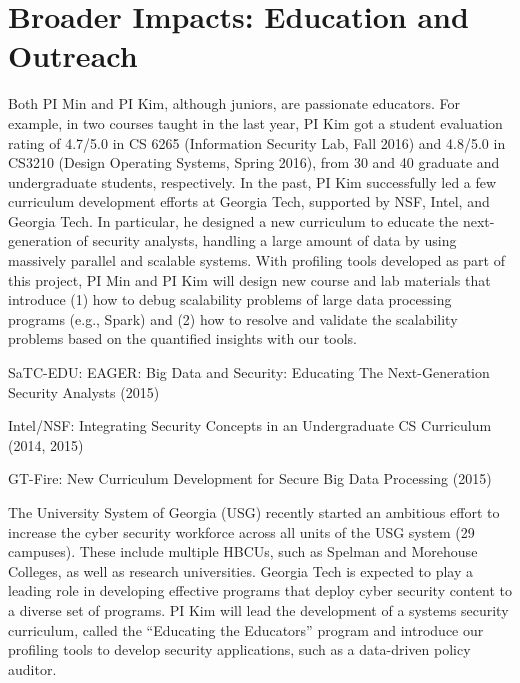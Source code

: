 \section{Broader Impacts: Education and Outreach}
\label{sec:impact}

Both PI Min and PI Kim, although juniors, are passionate
educators. For example, in two courses taught in the last year, 
PI Kim got a student evaluation rating of 4.7/5.0 in CS 6265 (Information Security Lab, Fall 2016)
and 4.8/5.0 in CS3210 (Design Operating Systems, Spring 2016),
from 30 and 40 graduate and undergraduate students, respectively.
%
In the past, PI Kim successfully led a few curriculum development efforts
at Georgia Tech, supported by NSF, Intel, and Georgia Tech. In particular,
he designed a new curriculum to educate
the next-generation of security analysts,
handling a large amount of data
by using massively parallel and scalable systems.
%
With profiling tools developed as part of this project, 
PI Min and PI Kim will design new course and lab materials
that introduce (1) how to debug scalability problems of
large data processing programs (e.g., Spark)
and (2) how to resolve and validate the scalability problems
based on the quantified insights with our tools.

\squishlist
\item SaTC-EDU: EAGER: Big Data and Security: Educating The Next-Generation Security Analysts (2015)
\item Intel/NSF: Integrating Security Concepts in an Undergraduate CS Curriculum (2014, 2015)
\item GT-Fire: New Curriculum Development for Secure Big Data Processing (2015)
\squishend

The University System of Georgia (USG) recently started an ambitious
effort to increase the cyber security workforce
across all units of the USG system (29 campuses). 
%
These include multiple HBCUs, such as Spelman and Morehouse
Colleges, as well as research universities.
%
Georgia Tech is expected to play a leading role in developing effective
programs that deploy cyber security content to a diverse set of programs.
%
PI Kim will lead the development of a systems security curriculum,
called the ``Educating the Educators'' program
and introduce our profiling tools to develop
security applications, such as a data-driven policy auditor.

